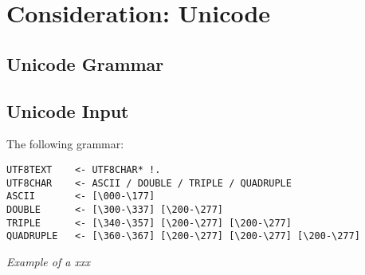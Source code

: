 \section{Consideration: Unicode}

\subsection{Unicode Grammar}

\subsection{Unicode Input}

The following grammar:

\begin{myquote}
\begin{verbatim}
UTF8TEXT    <- UTF8CHAR* !.
UTF8CHAR    <- ASCII / DOUBLE / TRIPLE / QUADRUPLE
ASCII       <- [\000-\177]
DOUBLE      <- [\300-\337] [\200-\277]
TRIPLE      <- [\340-\357] [\200-\277] [\200-\277]
QUADRUPLE   <- [\360-\367] [\200-\277] [\200-\277] [\200-\277]

\end{verbatim}
\end{myquote}
\textit{Example of a xxx}


